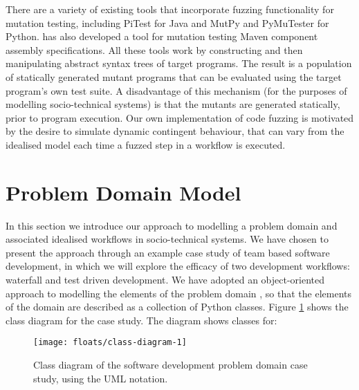\documentclass{sig-alternate}
\begin{document}
There are a variety of existing tools that incorporate fuzzing functionality for mutation testing, including PiTest
\citep{coles14pitest} for Java and MutPy \citep{mutpy26} and PyMuTester \citep{pymuttester} for Python.
\citet{storer15ringneck-repos} has also developed a tool for mutation testing Maven component assembly
specifications. All these tools work by constructing and then manipulating abstract syntax trees of target programs.
The result is a population of statically generated mutant programs that can be evaluated using the target program's own
test suite.  A disadvantage of this mechanism (for the purposes of modelling socio-technical systems) is that the
mutants are generated statically, prior to program execution.  Our own implementation of code fuzzing is motivated by
the desire to simulate dynamic contingent behaviour, that can vary from the idealised model each time a fuzzed step in a
workflow is executed.


\section{Problem Domain Model}


In this section we introduce our approach to modelling a problem domain and associated idealised workflows in
socio-technical systems.  We have chosen to present the approach through an example case study of team based software
development, in which we will explore the efficacy of two development workflows: waterfall and test driven development.
We have adopted an object-oriented approach to modelling the elements of the problem domain \citep{bennett06object}, so
that the elements of the domain are described as a collection of Python classes.  Figure \ref{fig:feature-class-diagram}
shows the class diagram for the case study.  The diagram shows classes for:

\begin{figure}
  
  \centering
  \texttt{[image: floats/class-diagram-1]}
  
  \caption{Class diagram of the software development problem domain case study, using the UML notation.}
  \label{fig:feature-class-diagram}
  
\end{figure}
\end{document}
